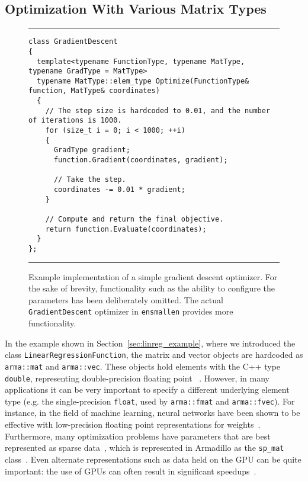 \subsection{Optimization With Various Matrix Types}
\label{sec:templated_optimize}


\begin{figure}[b!]
\hrule
\vspace{1ex}
\begin{verbatim}
class GradientDescent
{
  template<typename FunctionType, typename MatType, typename GradType = MatType>
  typename MatType::elem_type Optimize(FunctionType& function, MatType& coordinates)
  {
    // The step size is hardcoded to 0.01, and the number of iterations is 1000.
    for (size_t i = 0; i < 1000; ++i)
    {
      GradType gradient;
      function.Gradient(coordinates, gradient);

      // Take the step.
      coordinates -= 0.01 * gradient;
    }

    // Compute and return the final objective.
    return function.Evaluate(coordinates);
  }
};
\end{verbatim}
\hrule
\vspace*{-0.5em}
\caption{Example implementation of a simple gradient descent optimizer.
For the sake of brevity, functionality such as the ability to configure the parameters has
been deliberately omitted.
The actual {\tt GradientDescent} optimizer in {\tt ensmallen} provides more functionality.
}

\label{fig:gd}
\end{figure}

In the example shown in Section~\ref{sec:linreg_example},
where we introduced the class {\tt LinearRegressionFunction},
the matrix and vector objects are hardcoded as {\tt arma::mat} and {\tt arma::vec}.
These objects hold elements with the C++ type {\tt double},
representing double-precision floating point~\cite{TODO} .
However, in many applications it can be very important to specify a different
underlying element type (e.g. the single-precision {\tt float}, used by {\tt arma::fmat} and {\tt arma::fvec}).
For instance, in the field of machine learning, neural
networks have been shown to be effective with low-precision floating point
representations for weights~\cite{vanhoucke2011improving}.
Furthermore, many optimization problems have parameters
that are best represented as sparse data~\cite{van2011sparse, recht2011hogwild},
which is represented in Armadillo as the {\tt sp\_mat} class~\cite{sanderson2018user, mca24030070}.
Even alternate representations such as data held on the GPU can be quite
important: the use of GPUs can often result in significant
speedups~\cite{oh2004gpu, athanasopoulos2011gpu}.

